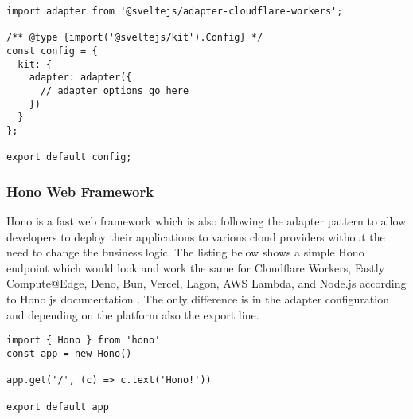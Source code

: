 \begin{lstlisting}[frame=lines, style=ES6, caption={svelte.config.js SvelteKit adapter configuration}, showstringspaces=false, captionpos=b,]
import adapter from '@sveltejs/adapter-cloudflare-workers';
 
/** @type {import('@sveltejs/kit').Config} */
const config = {
  kit: {
    adapter: adapter({
      // adapter options go here
    })
  }
};
 
export default config;
\end{lstlisting}

\subsubsection{Hono Web Framework}

Hono \cite{honocommunity_2023_hono} is a fast web framework which is also following the adapter pattern to allow developers to deploy their applications to various cloud providers without the need to change the business logic. The listing below shows a simple Hono endpoint which would look and work the same for Cloudflare Workers, Fastly Compute@Edge, Deno, Bun, Vercel, Lagon, AWS Lambda, and Node.js according to Hono js documentation \cite{honocommunity_2023_hono}. The only difference is in the adapter configuration and depending on the platform also the export line. 

\begin{lstlisting}[frame=lines, style=ES6, caption={Hono Handler function}, showstringspaces=false, captionpos=b,]
import { Hono } from 'hono'
const app = new Hono()

app.get('/', (c) => c.text('Hono!'))

export default app
\end{lstlisting}

